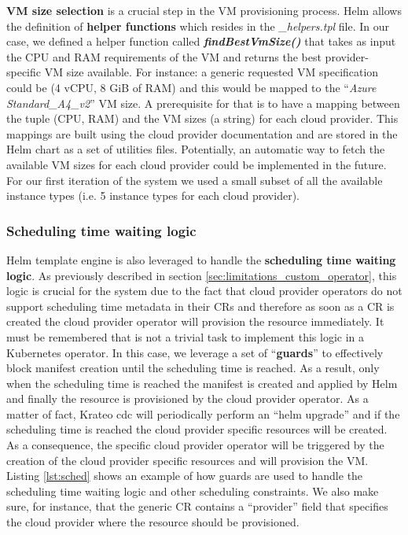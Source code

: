 \textbf{VM size selection} is a crucial step in the VM provisioning process.
Helm allows the definition of \textbf{helper functions} which resides in the \textit{\_helpers.tpl} file.
In our case, we defined a helper function called \textbf{\textit{findBestVmSize()}} that takes as input the CPU and RAM requirements of the VM and returns the best provider-specific VM size available.
For instance: a generic requested VM specification could be (4 vCPU, 8 GiB of RAM) and this would be mapped to the ``\textit{Azure Standard\_A4\_v2}'' VM size.
A prerequisite for that is to have a mapping between the tuple (CPU, RAM) and the VM sizes (a string) for each cloud provider.
This mappings are built using the cloud provider documentation and are stored in the Helm chart as a set of utilities files.
Potentially, an automatic way to fetch the available VM sizes for each cloud provider could be implemented in the future.
For our first iteration of the system we used a small subset of all the available instance types (i.e. 5 instance types for each cloud provider).

\subsubsection{Scheduling time waiting logic}
\label{sec:scheduling_time_waiting_logic}

Helm template engine is also leveraged to handle the \textbf{scheduling time waiting logic}.
As previously described in section \ref{sec:limitations_custom_operator}, this logic is crucial for the system due to the fact that cloud provider operators do not support scheduling time metadata in their CRs and therefore as soon as a CR is created the cloud provider operator will provision the resource immediately.
It must be remembered that is not a trivial task to implement this logic in a Kubernetes operator.
In this case, we leverage a set of ``\textbf{guards}'' to effectively block manifest creation until the scheduling time is reached. 
As a result, only when the scheduling time is reached the manifest is created and applied by Helm and finally the resource is provisioned by the cloud provider operator.
As a matter of fact, Krateo cdc will periodically perform an ``helm upgrade'' and if the scheduling time is reached the cloud provider specific resources will be created. 
As a consequence, the specific cloud provider operator will be triggered by the creation of the cloud provider specific resources and will provision the VM.
Listing \ref{lst:sched} shows an example of how guards are used to handle the scheduling time waiting logic and other scheduling constraints.
We also make sure, for instance, that the generic CR contains a ``provider'' field that specifies the cloud provider where the resource should be provisioned.

